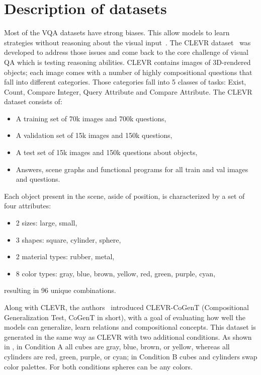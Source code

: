 \appendix

\section{Description of datasets}

Most of the VQA datasets have strong biases. This allow models to learn strategies without reasoning about the visual input~\cite{Santoro2017ASN}.
The CLEVR dataset~\cite{johnson2017clevr} was developed to address those issues and come back to the core challenge of visual QA which is testing reasoning abilities.
CLEVR contains images of 3D-rendered objects; each image comes with a number of highly compositional questions that fall into different categories.
Those categories fall into 5 classes of tasks: Exist, Count, Compare Integer, Query Attribute and Compare Attribute. 
The CLEVR dataset consists of:
\begin{itemize}
\item 	A training set of 70k images and 700k questions,
\item	A validation set of 15k images and 150k questions,
\item	A test  set of 15k images and 150k questions about objects,
\item	Answers, scene graphs and functional programs for all train and val images and questions.
\end{itemize}
Each object present in the scene, aside of position, is characterized by a set of four attributes:
\begin{itemize}
\item 2 sizes: large, small,
\item 3 shapes: square, cylinder, sphere,
\item 2 material types: rubber, metal,
\item 8 color types: gray, blue, brown, yellow, red, green, purple, cyan,
\end{itemize}
resulting in 96 unique combinations.

Along with CLEVR, the authors~\cite{johnson2017clevr} introduced  CLEVR-CoGenT (Compositional Generalization Test, CoGenT in short), with a goal of evaluating how well the models can generalize, learn relations and compositional concepts.
This dataset is generated in the same way as CLEVR with two additional conditions.
As shown in , in Condition A all cubes are gray, blue, brown, or yellow, whereas all cylinders are red, green, purple, or cyan; in Condition B cubes and cylinders swap color palettes.
For both conditions spheres can be any colors.


